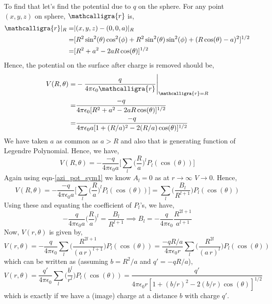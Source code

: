 \documentclass{article}
\newcommand{\scriptr}{\mathord{\mathcalligra{r}}}
\begin{document}
\begin{note}
    To find that let's find the potential due to $q$ on the sphere. For any point $(x,y,z)$ on sphere, $\scriptr$ is,
    \begin{equation*}
        \begin{split}
            \scriptr |_R =& |(x,y,z) - (0,0,a)|_{R}\\
            =& [R^2 \sin^2(\theta)\cos^2(\phi)+ R^2 \sin^2(\theta)\sin^2(\phi)+(R\cos(\theta)-a)^2]^{1/2}\\
             =& [R^2 + a^2 - 2aR\cos(\theta)]^{1/2}
        \end{split}
    \end{equation*}
    Hence, the potential on the surface after charge is removed should be,
    \begin{equation*}
    \begin{split}
            V(R,\theta) =& -\frac{q}{4\pi \epsilon_0 \scriptr}\Bigg|_{\scriptr=R}\\
            =& \frac{-q}{4\pi\epsilon_0[R^2 + a^2 - 2aR\cos(\theta)]^{1/2}}\\
            =& \frac{-q}{4\pi\epsilon_0 a[1 + (R/a)^2 - 2(R/a)\cos(\theta)]^{1/2}}
        \end{split}
    \end{equation*}
    We have taken $a$ as common as $a>R$ and also that is generating function of Legendre Polynomial. Hence, we have,
    \begin{equation}
        V(R,\theta) = -\frac{-q}{4\pi\epsilon_0 a}\Big[ \sum_l \Big(\frac{R}{a}\Big)^l P_l(\cos(\theta))\Big]
    \end{equation}
    Again using eqn-\ref{azi_pot_sym1} we know $A_l=0$ as at $r\to\infty$ $V\to 0$. Hence,
    \begin{equation*}
        V(R,\theta) = -\frac{-q}{4\pi\epsilon_0 a}\Big[ \sum_l \Big(\frac{R}{a}\Big)^l P_l(\cos(\theta))\Big] = \sum_{l}\Bigg( \frac{B_l}{R^{l+1}} \Bigg)P_l(\cos(\theta))
    \end{equation*}
    Using these and equating the coefficient of $P_l$'s, we have,
    \begin{equation*}
        -\frac{q}{4\pi \epsilon_0 a}\Bigg(\frac{R}{a}\Bigg)^l=\frac{B_l}{R^{l+1}}\implies B_l = -\frac{q}{4\pi \epsilon_0}\frac{R^{2l+1}}{a^{l+1}}
    \end{equation*}
    Now, $V(r,\theta)$ is given by,
    \begin{equation}
        V(r,\theta) = -\frac{q}{4\pi \epsilon_0}\sum_{l}\Bigg( \frac{R^{2l+1}}{(a\,r)^{l+1}} \Bigg)P_l(\cos(\theta)) = \frac{-qR/a}{4\pi \epsilon_0 r}\sum_{l}\Bigg( \frac{R^{2l}}{(a\,r)^{l}} \Bigg)P_l(\cos(\theta))
    \end{equation}
    which can be written as (assuming $b = R^2/a$ and $q'=-qR/a$),
    \begin{equation}
        V(r,\theta) = \frac{q'}{4\pi \epsilon_0}\sum_{l}\Bigg( \frac{b^{l}}{r^{l}} \Bigg)P_l(\cos(\theta)) = \frac{q'}{4\pi\epsilon_0 r[1 + (b/r)^2 - 2(b/r)\cos(\theta)]^{1/2}}
    \end{equation}
    which is exactly if we have a (image) charge at a distance $b$ with charge $q'$.
\end{note}
\end{document}
